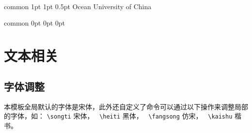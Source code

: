 \documentclass[
    report,     %
    oneside,    %
    UTF8,       %
    zihao=-4    %
]{config} %
\begin{document}



    

\Header
    {common} %
    {1pt} %
    {1pt} %
    {0.5pt} %
    {Ocean University of China} %
    {} %
    {\currentChapterInfo} %


\Footer
    {common} %
    {0pt} %
    {0pt} %
    {0pt} %
    {} %
    {\thepage} %
    {} %


\SetArabicPageNumber{} %




\chapter{文本相关}

\section{字体调整}

本模板全局默认的字体是宋体，此外还自定义了命令可以通过以下操作来调整局部的字体，如：
\verb|\songti|  {\songti 宋体}， \ 
\verb|\heiti|  {\heiti 黑体}， \ 
\verb|\fangsong|  {\fangsong 仿宋}， \ 
\verb|\kaishu|  {\kaishu 楷书}。
\end{document}
